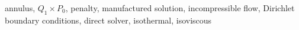 \sffamily
annulus, 
$Q_1\times P_0$, 
penalty, 
manufactured solution,  
incompressible flow,
Dirichlet boundary conditions,
direct solver,
isothermal,
isoviscous

